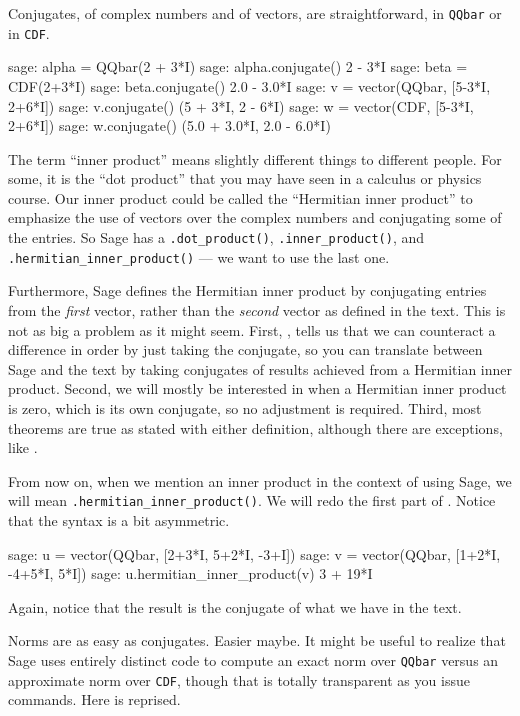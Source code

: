 Conjugates, of complex numbers and of vectors, are straightforward, in \verb?QQbar? or in \verb?CDF?.
%
\begin{sageexample}
sage: alpha = QQbar(2 + 3*I)
sage: alpha.conjugate()
2 - 3*I
sage: beta = CDF(2+3*I)
sage: beta.conjugate()
2.0 - 3.0*I
sage: v = vector(QQbar, [5-3*I, 2+6*I])
sage: v.conjugate()
(5 + 3*I, 2 - 6*I)
sage: w = vector(CDF, [5-3*I, 2+6*I])
sage: w.conjugate()
(5.0 + 3.0*I, 2.0 - 6.0*I)
\end{sageexample}
%
The term ``inner product'' means slightly different things to different people.  For some, it is the ``dot product'' that you may have seen in a calculus or physics course.  Our inner product could be called the ``Hermitian inner product'' to emphasize the use of vectors over the complex numbers and conjugating some of the entries.  So Sage has a \verb?.dot_product()?, \verb?.inner_product()?, and \verb?.hermitian_inner_product()? --- we want to use the last one.\par
%
Furthermore, Sage defines the Hermitian inner product by conjugating entries from the \emph{first} vector, rather than the \emph{second} vector as defined in the text.  This is not as big a problem as it might seem.  First, , tells us that we can counteract a difference in order by just taking the conjugate, so you can translate between Sage and the text by taking conjugates of results achieved from a Hermitian inner product.  Second, we will mostly be interested in when a Hermitian inner product is zero, which is its own conjugate, so no adjustment is required.  Third, most theorems are true as stated with either definition, although there are exceptions, like .\par
%
From now on, when we mention an inner product in the context of using Sage, we will mean \verb?.hermitian_inner_product()?.  We will redo the first part of .  Notice that the syntax is a bit asymmetric.
%
\begin{sageexample}
sage: u = vector(QQbar, [2+3*I,  5+2*I, -3+I])
sage: v = vector(QQbar, [1+2*I, -4+5*I,  5*I])
sage: u.hermitian_inner_product(v)
3 + 19*I
\end{sageexample}
%
Again, notice that the result is the conjugate of what we have in the text.\par
%
Norms are as easy as conjugates.  Easier maybe.  It might be useful to realize that Sage uses entirely distinct code to compute an exact norm over \verb?QQbar? versus an approximate norm over \verb?CDF?, though that is totally transparent as you issue commands.  Here is  reprised.
%
\begin{sageverbatim}
\end{sageverbatim}
%

